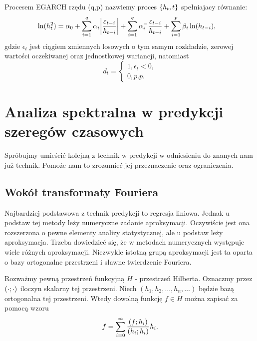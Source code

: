 \documentclass[10pt,a4paper]{book}
\begin{document}
\begin{definition}
Procesem EGARCH rzędu (q,p) nazwiemy proces $\left\lbrace {{h_t}, {t}} \right\rbrace$ spełniajacy równanie:
\begin{align*}
\ln(h_t^2) &= \alpha_0 + \sum_{i=1}^{q} \alpha_i \abs{\frac{\epsilon_{t-i}}{h_{t-i}}} + 
\sum_{i=1}^{q} \alpha^{-}_i \frac{\epsilon_{t-i}}{h_{t-i}} + 
\sum_{i=1}^{p} \beta_{i} \ln(h_{t-i}),
\end{align*}
gdzie $\epsilon_t$ jest ciągiem zmiennych losowych o tym samym rozkładzie, zerowej wartości oczekiwanej oraz jednostkowej wariancji, natomiast
$$
d_t = \begin{cases} 1, \epsilon_t < 0, \\ 0, p.p. \end{cases}
$$
\end{definition}

\chapter{Analiza spektralna w predykcji szeregów czasowych}

Spróbujmy umieścić kolejną z technik w predykcji w odniesieniu do znanych nam już technik. Pomoże nam to zrozumieć jej przeznaczenie oraz ograniczenia.

\section{Wokół transformaty Fouriera}

Najbardziej podstawowa z technik predykcji to regresja liniowa. Jednak u podstaw tej metody leży numeryczne zadanie aproksymacji. Oczywiście jest ona rozszerzona o pewne elementy analizy statystycznej, ale u podstaw leży aproksymacja. Trzeba dowiedzieć się, że w metodach numerycznych występuje wiele różnych aproksymacji. Niezwykle istotną grupą aproksymacji jest ta oparta o bazy ortogonalne przestrzeni i sławne twierdzenie Fouriera.

\begin{theorem}
Rozważmy pewną przestrzeń funkcyjną $H$ - przestrzeń Hilberta. Oznaczmy przez $\left( {\cdot} ; {\cdot} \right)_{}$ iloczyn skalarny tej przestrzeni. Niech $(h_1, h_2, \ldots, h_n, \ldots)$ będzie bazą ortogonalna tej przestrzeni. Wtedy dowolną funkcję $f \in H$ można zapisać za pomocą wzoru
$$
f = \sum_{i=0}^{\infty} \frac{\scalar{f}{h_i} }{\scalar{h_i}{h_i}} h_i.
$$
\end{theorem}
\end{document}
